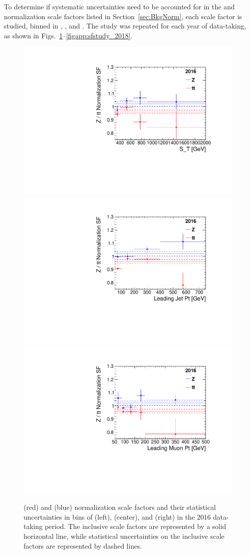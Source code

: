 To determine if systematic uncertainties need to be accounted for in the \ZJETS and \ttbar normalization scale factors listed in Section~\ref{sec:BkgNorm}, each scale factor is studied, binned in \ST, \ptof{\PmuOne}, and \ptof{\jetOne}. The study was repeated for each year of data-taking, as shown in Figs.~\ref{figapp:sfstudy_2016}--\ref{figapp:sfstudy_2018}.

\begin{figure}[H]
    \centering
    {\includegraphics[width=.4\textwidth]{Images/Analysis/SFStudy/mumuScaleFactors_ST_2016.pdf}}
    {\includegraphics[width=.4\textwidth]{Images/Analysis/SFStudy/mumuScaleFactors_jetPt_2016.pdf}}
    {\includegraphics[width=.4\textwidth]{Images/Analysis/SFStudy/mumuScaleFactors_muPt_2016.pdf}}
    \caption{\ZJETS (red) and \ttbar (blue) normalization scale factors and their statistical uncertainties in bins of \ST (left), \ptof{\PmuOne} (center), and \ptof{\jetOne} (right) in the 2016 data-taking period. The inclusive scale factors are represented by a solid horizontal line, while statistical uncertainties on the inclusive scale factors are represented by dashed lines.}
    \label{figapp:sfstudy_2016}
\end{figure}

